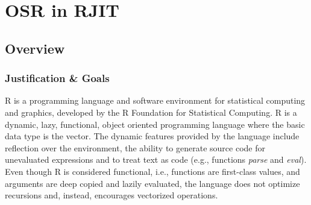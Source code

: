 
\chapter{OSR in RJIT} %

\label{Chapter4New} %


\newcommand{\keyword}[1]{\textbf{#1}}
\newcommand{\tabhead}[1]{\textbf{#1}}
\newcommand{\code}[1]{\texttt{#1}}
\newcommand{\file}[1]{\texttt{\bfseries#1}}
\newcommand{\option}[1]{\texttt{\itshape#1}}

\section{Overview}
\subsection{Justification \& Goals}\label{justificationgoals}
            
R is a programming language and software environment for statistical computing and graphics, developed by the R Foundation for Statistical Computing\cite{RURL}.
R is a dynamic, lazy, functional, object oriented programming language where the basic data type is the vector.
The dynamic features provided by the language include reflection over the environment, the ability to generate source code for unevaluated expressions and to treat text as code (e.g., functions \textit{parse} and \textit{eval}).
Even though R is considered functional, i.e., functions are first-class values, and arguments are deep copied and lazily evaluated, the language does not optimize recursions and, instead, encourages vectorized operations.\\

